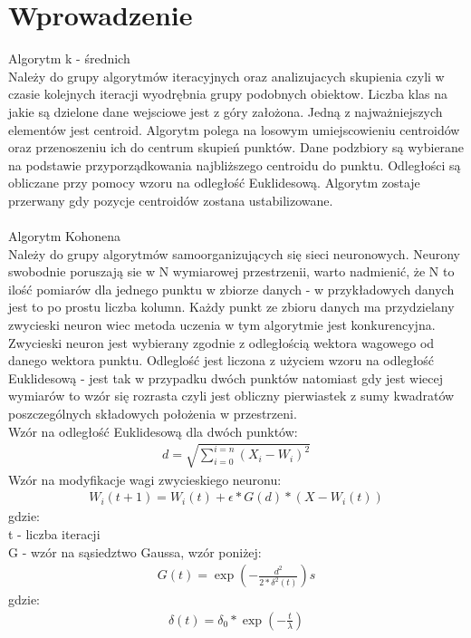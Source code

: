\documentclass{classrep}
\begin{document}
\section{Wprowadzenie}
{Algorytm k - średnich\\
Należy do grupy algorytmów iteracyjnych oraz analizujacych skupienia czyli w czasie kolejnych iteracji wyodrębnia grupy podobnych obiektow. Liczba klas na jakie są dzielone dane wejsciowe jest z góry założona. Jedną z najważniejszych elementów jest centroid. Algorytm polega na losowym umiejscowieniu centroidów oraz przenoszeniu ich do centrum skupień punktów. Dane podzbiory są wybierane na podstawie przyporządkowania najbliższego centroidu do punktu. Odległości są obliczane przy pomocy wzoru na odległość Euklidesową. Algorytm zostaje przerwany gdy pozycje centroidów zostana ustabilizowane.\\\\

Algorytm Kohonena\\
Należy do grupy algorytmów samoorganizujących się sieci neuronowych. Neurony swobodnie poruszają sie w N wymiarowej przestrzenii, warto nadmienić, że N to ilość pomiarów dla jednego punktu w zbiorze danych - w przykładowych danych jest to po prostu liczba kolumn. Każdy punkt ze zbioru danych ma przydzielany zwycieski neuron wiec metoda uczenia w tym algorytmie jest konkurencyjna. Zwycieski neuron jest wybierany zgodnie z odległością wektora wagowego od danego wektora punktu. Odleglość jest liczona z użyciem wzoru na odległość Euklidesową - jest tak w przypadku dwóch punktów natomiast gdy jest wiecej wymiarów to wzór się rozrasta czyli jest obliczny pierwiastek z sumy kwadratów poszczególnych składowych położenia w przestrzeni. \\

Wzór na odległość Euklidesową dla dwóch punktów: 
\begin{align*}
d=\displaystyle\sqrt{\sum_{i=0}^{i=n} {(X_i - W_i)^2}}
\end{align*}
Wzór na modyfikacje wagi zwycieskiego neuronu: 
\begin{align*}
W_i(t + 1) = W_i(t) + \epsilon * G(d)* (X - W_i(t))
\end{align*}
gdzie:\\
t - liczba iteracji\\
G - wzór na sąsiedztwo Gaussa, wzór poniżej:
\begin{align*}
G(t) = \exp (-\frac{d^2} {2* \delta^2(t)})s
\end{align*}
gdzie:
\begin{align*}
\delta(t) = \delta_0 * \exp (-\frac {t} { \lambda })
\end{align*}

}
\end{document}
